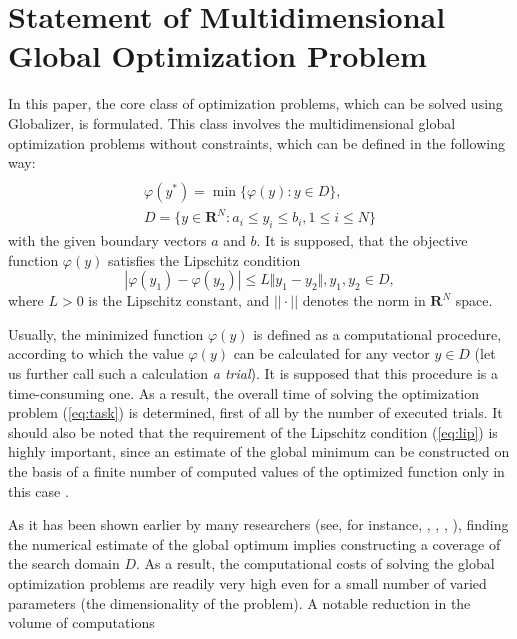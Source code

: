\documentclass[runningheads]{llncs}
\begin{document}
\section{Statement of Multidimensional Global Optimization Problem}
In this paper, the core class of optimization problems, which can be solved using
Globalizer, is formulated. This class involves the multidimensional global
optimization problems without constraints, which can be defined in the following way:
\begin{equation}
\label{eq:task}
\begin{array}{cr}\\
  \varphi(y^*)=\min\{\varphi(y):y\in D\}, \\
  D=\{y\in \mathbf{R}^N:a_i\leq y_i\leq{b_i}, 1\leq{i}\leq{N}\}
\end{array}
\end{equation}
with the given boundary vectors  $a$ and  $b$. It is supposed, that the objective function \(\varphi(y)\) satisfies the Lipschitz condition
\begin{equation}
\label{eq:lip}
|\varphi(y_1)-\varphi(y_2)|\leq L\Vert y_1-y_2\Vert,y_1,y_2\in D,
\end{equation}
where \(L>0\) is the Lipschitz constant, and \(||\cdot||\) denotes the norm in \(\mathbf{R}^N\) space.
\par
Usually, the minimized function \(\varphi(y)\) is defined as a computational procedure,
according to which the value \(\varphi(y)\) can be calculated for any vector \(y\in D\)
(let us further call such a calculation \textit{a trial}). It is supposed that this procedure
is a time-consuming one. As a result, the overall time of solving the optimization
problem (\ref{eq:task}) is determined, first of all by the number of executed trials.
It should also be noted that the requirement of the Lipschitz condition (\ref{eq:lip})
is highly important, since an estimate of the global minimum can be constructed on the
basis of a finite number of computed values of the optimized function only in this case .
\par
As it has been shown earlier by many researchers
(see, for instance, \cite{floudasPardalosGOState}, \cite{horstTuyGO}, \cite{pinterGO}, \cite{strSergGO}),
finding the numerical estimate of the global optimum implies constructing a coverage of
the search domain \(D\). As a result, the computational costs of solving the global
optimization problems are readily very high even for a small number of varied parameters
(the dimensionality of the problem). A notable reduction in the volume of computations
\end{document}

